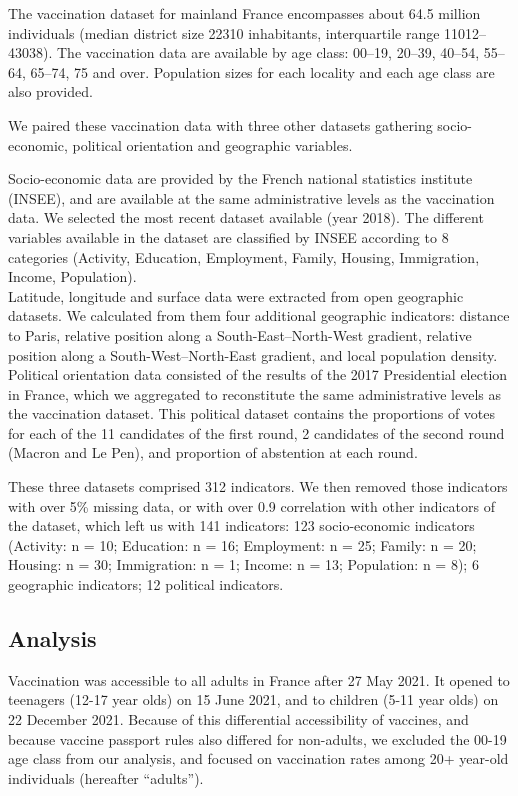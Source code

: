 \documentclass[
]{article}
\begin{document}
The vaccination dataset for mainland France encompasses about 64.5 million individuals (median district size 22310 inhabitants, interquartile range 11012--43038). The vaccination data are available by age class: 00--19, 20--39, 40--54, 55--64, 65--74, 75 and over. Population sizes for each locality and each age class are also provided.

We paired these vaccination data with three other datasets gathering socio-economic, political orientation and geographic variables.

Socio-economic data are provided by the French national statistics institute (INSEE), and are available at the same administrative levels as the vaccination data. We selected the most recent dataset available (year 2018). The different variables available in the dataset are classified by INSEE according to 8 categories (Activity, Education, Employment, Family, Housing, Immigration, Income, Population).\\
Latitude, longitude and surface data were extracted from open geographic datasets. We calculated from them four additional geographic indicators: distance to Paris, relative position along a South-East--North-West gradient, relative position along a South-West--North-East gradient, and local population density.\\
Political orientation data consisted of the results of the 2017 Presidential election in France, which we aggregated to reconstitute the same administrative levels as the vaccination dataset. This political dataset contains the proportions of votes for each of the 11 candidates of the first round, 2 candidates of the second round (Macron and Le Pen), and proportion of abstention at each round.

These three datasets comprised 312 indicators. We then removed those indicators with over 5\% missing data, or with over 0.9 correlation with other indicators of the dataset, which left us with 141 indicators: 123 socio-economic indicators (Activity: n = 10; Education: n = 16; Employment: n = 25; Family: n = 20; Housing: n = 30; Immigration: n = 1; Income: n = 13; Population: n = 8); 6 geographic indicators; 12 political indicators.

\hypertarget{analysis}{%
\subsection{Analysis}\label{analysis}}

Vaccination was accessible to all adults in France after 27 May 2021. It opened to teenagers (12-17 year olds) on 15 June 2021, and to children (5-11 year olds) on 22 December 2021. Because of this differential accessibility of vaccines, and because vaccine passport rules also differed for non-adults, we excluded the 00-19 age class from our analysis, and focused on vaccination rates among 20+ year-old individuals (hereafter ``adults'').
\end{document}
